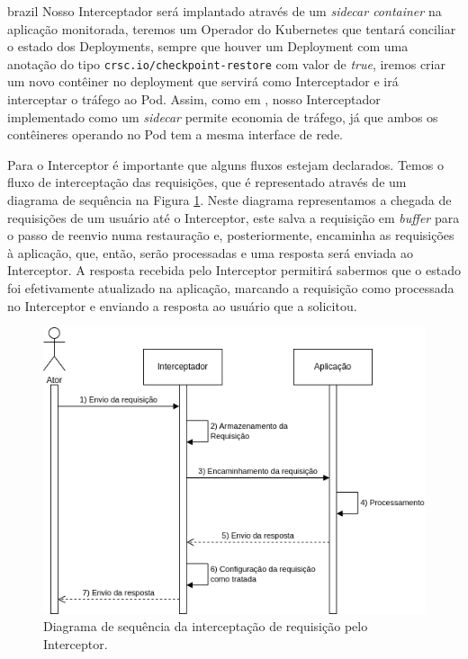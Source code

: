 \begin{otherlanguage*}{brazil}
Nosso Interceptador será implantado através de um \textit{sidecar container} na aplicação
monitorada, teremos um Operador do Kubernetes que tentará conciliar o estado dos Deployments,
sempre que houver um Deployment com uma anotação do tipo \texttt{crsc.io/checkpoint-restore}
com valor de \textit{true}, iremos criar um novo contêiner no deployment que servirá como 
Interceptador e irá interceptar o tráfego ao Pod. Assim, como em \cite{muller2022architecture},
nosso Interceptador implementado como um \textit{sidecar} permite economia de tráfego, já que
ambos os contêineres operando no Pod tem a mesma interface de rede.

Para o Interceptor é importante que alguns fluxos estejam declarados. Temos o fluxo de
interceptação das requisições, que é representado através de um diagrama de sequência na
Figura \ref{fig:interceptor-request-interception}. Neste diagrama representamos a chegada
de requisições de um usuário até o Interceptor, este salva a requisição em \textit{buffer} para
o passo de reenvio numa restauração e, posteriormente, encaminha as requisições à aplicação,
que, então, serão processadas e uma resposta será enviada ao Interceptor. A resposta
recebida pelo Interceptor permitirá sabermos que o estado foi efetivamente atualizado
na aplicação, marcando a requisição como processada no Interceptor e enviando a resposta ao
usuário que a solicitou.

\begin{figure}[h]
\centering
\includegraphics[scale=0.72]{images/interceptor-intercept.png}
\caption{Diagrama de sequência da interceptação de requisição pelo Interceptor.}
\label{fig:interceptor-request-interception}
\end{figure}


\end{otherlanguage*}
